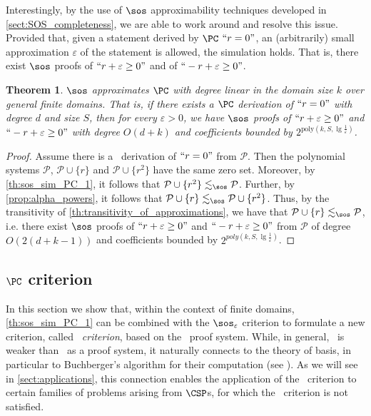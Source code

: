 \documentclass[11pt]{article}
\newtheorem{theorem}{Theorem}[section]
\begin{document}
Interestingly, by the use of $\sos$ approximability techniques developed in \cref{sect:SOS_completeness}, we are able to work around and resolve this issue. Provided that, given a statement derived by $\PC$ $``r = 0"$, an (arbitrarily) small approximation $\varepsilon$ of the statement is allowed, the simulation holds. That is, there exist $\sos$ proofs of $`` r + \varepsilon \geq 0"$ and of $``- r + \varepsilon \geq 0"$.

\begin{theorem}\label{th:sospc}
    $\sos$ \emph{approximates} $\PC$ with degree linear in the domain size $k$ over general finite domains. That is, if there exists a \(\PC\) derivation of \( ``r=0" \) with degree \( d \) and size \( S \), then for every \( \varepsilon > 0 \), we have \(\sos\) proofs of \( ``r+\varepsilon \geq 0" \) and \( ``-r+\varepsilon \geq 0" \) with degree \( O(d+k) \) and coefficients bounded by \( 2^{\text{poly}(k, S, \lg \frac{1}{\varepsilon})} \).
\end{theorem}

\begin{proof}
    Assume there is a \PC\ derivation of $``r=0"$ from $\mathcal{P}$. Then the polynomial systems $\mathcal{P}$, $\mathcal{P}\cup\{r\}$ and $\mathcal{P}\cup\{r^2\}$ have the same zero set. Moreover, by \cref{th:sos_sim_PC_1}, it follows that $\mathcal{P}\cup \{r^2\} \lesssim_{\sos} \mathcal{P}$. Further, by \cref{prop:alpha_powers}, it follows that $\mathcal{P}\cup \{r\} \lesssim_{\sos}\mathcal{P}\cup \{r^2\}$. Thus, by the transitivity of \cref{th:transitivity_of_approximations}, we have that $\mathcal{P}\cup \{r\} \lesssim_{\sos} \mathcal{P}$, i.e. there exist $\sos$ proofs of $``r+\varepsilon\geq 0"$ and $``-r+\varepsilon\geq 0"$ from $\mathcal{P}$ of degree $O(2(d+k-1))$ and coefficients bounded by $2^{poly(k, S, \lg \frac{1}{\varepsilon})}$.
\end{proof}

\subsection[PC criterion]{$\PC$ criterion}\label{sect:pc_crit}

In this section we show that, within the context of finite domains, \cref{th:sos_sim_PC_1} can be combined with the $\sos_{\varepsilon}$ criterion to formulate a new criterion, called \emph{\PC\ criterion}, based on the \PC\ proof system. 
While, in general, \PC\ is weaker than \sos\ as a proof system, it naturally connects to the theory of \GB basis, in particular to Buchberger's algorithm for their computation (see \cite{BuchbergerThesis}).
As we will see in \cref{sect:applications}, this connection enables the application of the \PC\ criterion to certain families of problems arising from $\CSP$s, for which the \Nsatz\ criterion is not satisfied.
\end{document}
